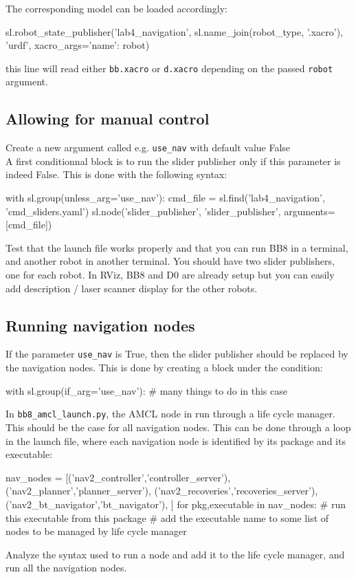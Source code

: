 \documentclass{ecnreport}
\begin{document}
The corresponding model can be loaded accordingly:
\begin{pythoncodelarge}
sl.robot_state_publisher('lab4_navigation', 
                          sl.name_join(robot_type, '.xacro'),
                         'urdf', xacro_args={'name': robot})
\end{pythoncodelarge}this line will read either \texttt{bb.xacro} or \texttt{d.xacro} depending on the passed \texttt{robot} argument. 

\subsection{Allowing for manual control}

Create a new argument called e.g. \texttt{use\_nav} with default value False \\

A first conditionnal block is to run the slider publisher only if this parameter is indeed False. This is done with the following syntax:
\begin{pythoncodelarge}
with sl.group(unless_arg='use_nav'):
    cmd_file = sl.find('lab4_navigation', 'cmd_sliders.yaml')
    sl.node('slider_publisher', 'slider_publisher', arguments=[cmd_file])
\end{pythoncodelarge}

Test that the launch file works properly and that you can run BB8 in a terminal, and another robot in another terminal. You should have two slider publishers, one for each robot. In RViz, BB8 and D0 are already setup but you can easily add description / laser scanner display for the other robots.

\subsection{Running navigation nodes}

If the parameter \texttt{use\_nav} is True, then the slider publisher should be replaced by the navigation nodes. This is done by creating a block under the condition:
\begin{pythoncodelarge}
with sl.group(if_arg='use_nav'):
    # many things to do in this case
\end{pythoncodelarge}

In \texttt{bb8\_amcl\_launch.py}, the AMCL node in run through a life cycle manager. This should be the case for all navigation nodes. This can be done through a loop in the launch file, where each navigation node is identified by its package and its executable:
\begin{pythoncodelarge}
nav_nodes = [('nav2_controller','controller_server'), 
        ('nav2_planner','planner_server'),
        ('nav2_recoveries','recoveries_server'),
        ('nav2_bt_navigator','bt_navigator'),
        ]
for pkg,executable in nav_nodes:
    # run this executable from this package
    # add the executable name to some list of nodes to be managed by life cycle manager
\end{pythoncodelarge}Analyze the syntax used to run a node and add it to the life cycle manager, and run all the navigation nodes.\\
\end{document}
